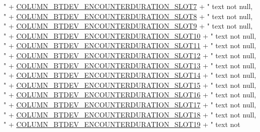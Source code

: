 \begin{DoxyCode}
{       "}
              + \hyperlink{classcom_1_1social_1_1proximity_1_1_s_q_lite_helper_a067a13e5269073d37f02fd3ed84d9f29}{COLUMN\_BTDEV\_ENCOUNTERDURATION\_SLOT7} + \textcolor{stringliteral}{" text not null,
       "}
              + \hyperlink{classcom_1_1social_1_1proximity_1_1_s_q_lite_helper_af64db8c92d3946598301b604c023cedf}{COLUMN\_BTDEV\_ENCOUNTERDURATION\_SLOT8} + \textcolor{stringliteral}{" text not null,
       "}
              + \hyperlink{classcom_1_1social_1_1proximity_1_1_s_q_lite_helper_ac158849584082cfe70d33c70cedf4755}{COLUMN\_BTDEV\_ENCOUNTERDURATION\_SLOT9} + \textcolor{stringliteral}{" text not null,
       "}
              + \hyperlink{classcom_1_1social_1_1proximity_1_1_s_q_lite_helper_a5ba0cd9a977e655f9d6989b39d0aa8b4}{COLUMN\_BTDEV\_ENCOUNTERDURATION\_SLOT10} + \textcolor{stringliteral}{" text not
       null, "}
              + \hyperlink{classcom_1_1social_1_1proximity_1_1_s_q_lite_helper_a3ce051a1a793dab86096dc134f868209}{COLUMN\_BTDEV\_ENCOUNTERDURATION\_SLOT11} + \textcolor{stringliteral}{" text not
       null, "}
              + \hyperlink{classcom_1_1social_1_1proximity_1_1_s_q_lite_helper_a246ee25c1f15c42957c92bfa5ee09c7c}{COLUMN\_BTDEV\_ENCOUNTERDURATION\_SLOT12} + \textcolor{stringliteral}{" text not
       null, "}
              + \hyperlink{classcom_1_1social_1_1proximity_1_1_s_q_lite_helper_a9480c974d7f0ef4045ca4c34d9af46b6}{COLUMN\_BTDEV\_ENCOUNTERDURATION\_SLOT13} + \textcolor{stringliteral}{" text not
       null, "}
              + \hyperlink{classcom_1_1social_1_1proximity_1_1_s_q_lite_helper_a1dcbfded30adb9b942ba4e81400ee4cf}{COLUMN\_BTDEV\_ENCOUNTERDURATION\_SLOT14} + \textcolor{stringliteral}{" text not
       null, "}
              + \hyperlink{classcom_1_1social_1_1proximity_1_1_s_q_lite_helper_a20ffddb39e9b7a0de16c22e97a1fe59e}{COLUMN\_BTDEV\_ENCOUNTERDURATION\_SLOT15} + \textcolor{stringliteral}{" text not
       null, "}
              + \hyperlink{classcom_1_1social_1_1proximity_1_1_s_q_lite_helper_a17332b2dcfbf24bac890a6938b985e07}{COLUMN\_BTDEV\_ENCOUNTERDURATION\_SLOT16} + \textcolor{stringliteral}{" text not
       null, "}
              + \hyperlink{classcom_1_1social_1_1proximity_1_1_s_q_lite_helper_ad89f48a90c002e224b42a61c53a1646c}{COLUMN\_BTDEV\_ENCOUNTERDURATION\_SLOT17} + \textcolor{stringliteral}{" text not
       null, "}
              + \hyperlink{classcom_1_1social_1_1proximity_1_1_s_q_lite_helper_a31c1917e141416f90f40b134635332ac}{COLUMN\_BTDEV\_ENCOUNTERDURATION\_SLOT18} + \textcolor{stringliteral}{" text not
       null, "}
              + \hyperlink{classcom_1_1social_1_1proximity_1_1_s_q_lite_helper_a7566bf6b0339022bbd22a2bf01c491ed}{COLUMN\_BTDEV\_ENCOUNTERDURATION\_SLOT19} + \textcolor{stringliteral}{" text not
}
\end{DoxyCode}
